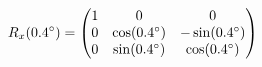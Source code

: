 \documentclass[preview]{standalone}
\begin{document}
\begin{align*}
\special{dvisvgm:raw <g id='unique000'>}R_x(0.4^\circ) = \begin{pmatrix} 1 & 0 & 0 \\ 0 & \cos(0.4^\circ) & -\sin(0.4^\circ) \\ 0 & \sin(0.4^\circ) & \cos(0.4^\circ) \end{pmatrix}\special{dvisvgm:raw </g>}
\end{align*}
\end{document}
